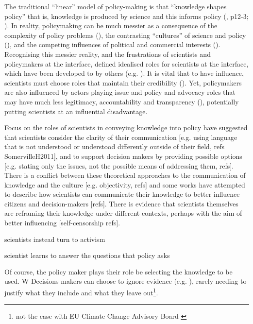 The traditional ``linear'' model of policy-making is that ``knowledge shapes policy'' that is, knowledge is produced by science and this informs policy (\cite{Pielke2007}, p12-3; \cite{BoswellS2017}). In reality, policymaking can be much messier as a consequence of the complexity of policy problems (\cite{Cairney2016}), the contrasting ``cultures'' of science and policy (\cite{Dale2002,Obermeister2022}), and the competing influences of political and commercial interests (\cite{StoddardEtAl2021}). Recognising this messier reality, and the frustrations of scientists and policymakers at the interface, \textcite{Pielke2007} defined idealised roles for scientists at the interface, which have been developed to by others (e.g. \cite{RapleyD2014,GregoryBW2024}). It is vital that to have influence, scientists must choose roles that maintain their credibility (\cite{ColognaKMBMO2024,GregoryBW2024}). Yet, policymakers are also influenced by actors playing issue and policy and advocacy roles that may have much less legitimacy, accountability and transparency (\cite{Kingdon1993,Knaggard2015,Cairney2018,vonMalmborg2024strategies}), potentially putting scientists at an influential disadvantage. 



Focus on the roles of scientists in conveying knowledge into policy have suggested that scientists consider the clarity of their communication [e.g. using language that is not understood or understood differently outside of their field, refs SomervilleH2011], and to support decision makers by providing possible options [e.g. stating only the issues, not the possible means of addressing them, refs]. There is a conflict between these theoretical approaches to the communication of knowledge and the culture [e.g. objectivity, refs] and some works have attempted to describe how scientists can communicate their knowledge to better influence citizens and decision-makers [refs]. There is evidence that scientists themselves are reframing their knowledge under different contexts, perhaps with the aim of better influencing [self-censorship refs].

scientists instead turn to activism \cite{Pivovarchuk2024,GregoryBW2024}

scientist learns to answer the questions that policy asks \cite{Gerber2023}

Of course, the policy maker plays their role be selecting the knowledge to be used. W  Decisions makers can choose to ignore evidence (e.g. \cite{TennoyHLN2016}), rarely needing to justify what they include and what they leave out\footnote{not the case with EU Climate Change Advisory Board \cite{WardmanE2023}}.

